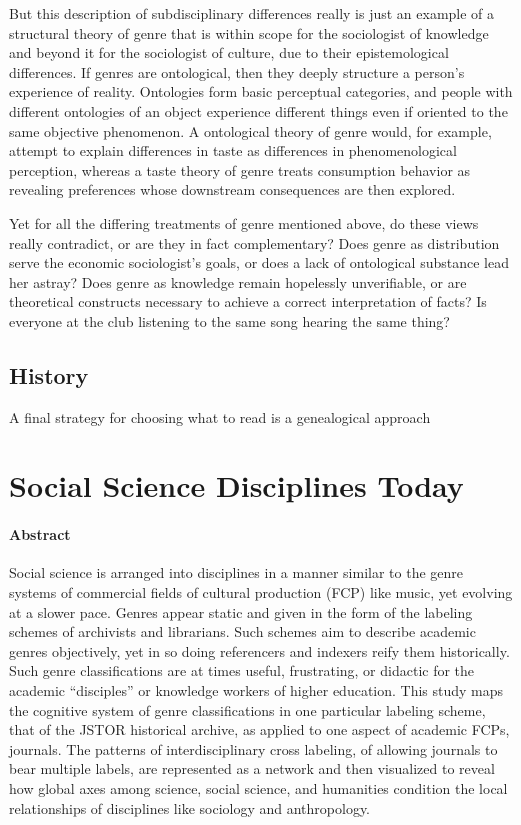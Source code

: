 \documentclass[]{book}
\theoremstyle{definition}
\theoremstyle{definition}
\theoremstyle{definition}
\theoremstyle{remark}
\begin{document}
But this description of subdisciplinary differences really is just an
example of a structural theory of genre that is within scope for the
sociologist of knowledge and beyond it for the sociologist of culture,
due to their epistemological differences. If genres are ontological,
then they deeply structure a person's experience of reality. Ontologies
form basic perceptual categories, and people with different ontologies
of an object experience different things even if oriented to the same
objective phenomenon. A ontological theory of genre would, for example,
attempt to explain differences in taste as differences in
phenomenological perception, whereas a taste theory of genre treats
consumption behavior as revealing preferences whose downstream
consequences are then explored.

Yet for all the differing treatments of genre mentioned above, do these
views really contradict, or are they in fact complementary? Does genre
as distribution serve the economic sociologist's goals, or does a lack
of ontological substance lead her astray? Does genre as knowledge remain
hopelessly unverifiable, or are theoretical constructs necessary to
achieve a correct interpretation of facts? Is everyone at the club
listening to the same song hearing the same thing?

\hypertarget{history}{%
\section{History}\label{history}}

A final strategy for choosing what to read is a genealogical approach
\citep{Foucault2002order}

\hypertarget{dis}{%
\chapter{Social Science Disciplines Today}\label{dis}}

\hypertarget{abstract-1}{%
\subsubsection*{Abstract}\label{abstract-1}}


Social science is arranged into disciplines in a manner
similar to the genre systems of commercial fields of cultural production
(FCP) like music, yet evolving at a slower pace. Genres appear static
and given in the form of the labeling schemes of archivists and
librarians. Such schemes aim to describe academic genres objectively,
yet in so doing referencers and indexers reify them historically. Such
genre classifications are at times useful, frustrating, or didactic for
the academic ``disciples'' or knowledge workers of higher education.
This study maps the cognitive system of genre classifications in one
particular labeling scheme, that of the JSTOR historical archive, as
applied to one aspect of academic FCPs, journals. The patterns of
interdisciplinary cross labeling, of allowing journals to bear multiple
labels, are represented as a network and then visualized to reveal how
global axes among science, social science, and humanities condition the
local relationships of disciplines like sociology and anthropology.
\end{document}
